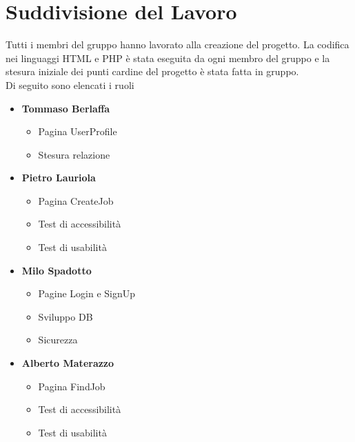 \section{Suddivisione del Lavoro}
Tutti i membri del gruppo hanno lavorato alla creazione del progetto. La codifica nei linguaggi HTML e PHP è stata eseguita da ogni membro del gruppo e la stesura iniziale 
dei punti cardine del progetto è stata fatta in gruppo. \\
Di seguito sono elencati i ruoli
\begin{itemize}
	\item \textbf{Tommaso Berlaffa}
	\begin{itemize}
    \item Pagina UserProfile
    \item Stesura relazione
	\end{itemize}
	\item \textbf{Pietro Lauriola}
	\begin{itemize}
    \item Pagina CreateJob
		\item Test di accessibilità
		\item Test di usabilità
	\end{itemize}
	\item \textbf{Milo Spadotto}
	\begin{itemize}
    \item Pagine Login e SignUp
		\item Sviluppo DB
		\item Sicurezza 
	\end{itemize}
	\item \textbf{Alberto Materazzo}
	\begin{itemize}
    \item Pagina FindJob
		\item Test di accessibilità
		\item Test di usabilità
	\end{itemize}
\end{itemize}